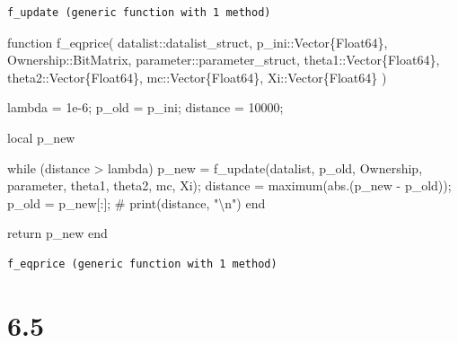\documentclass[
  letterpaper,
  DIV=11,
  numbers=noendperiod]{scrreprt}
\newenvironment{Shaded}{\begin{snugshade}}{\end{snugshade}}
\newcommand{\CommentTok}[1]{\textcolor[rgb]{0.37,0.37,0.37}{#1}}
\newcommand{\ControlFlowTok}[1]{\textcolor[rgb]{0.00,0.23,0.31}{#1}}
\newcommand{\DataTypeTok}[1]{\textcolor[rgb]{0.68,0.00,0.00}{#1}}
\newcommand{\FloatTok}[1]{\textcolor[rgb]{0.68,0.00,0.00}{#1}}
\newcommand{\FunctionTok}[1]{\textcolor[rgb]{0.28,0.35,0.67}{#1}}
\newcommand{\KeywordTok}[1]{\textcolor[rgb]{0.00,0.23,0.31}{#1}}
\newcommand{\NormalTok}[1]{\textcolor[rgb]{0.00,0.23,0.31}{#1}}
\newcommand{\OperatorTok}[1]{\textcolor[rgb]{0.37,0.37,0.37}{#1}}
\begin{document}
\begin{verbatim}
f_update (generic function with 1 method)
\end{verbatim}

\begin{Shaded}
\begin{Highlighting}[]
\KeywordTok{function} \FunctionTok{f\_eqprice}\NormalTok{(}
\NormalTok{        datalist}\OperatorTok{::}\DataTypeTok{datalist\_struct}\NormalTok{,}
\NormalTok{        p\_ini}\OperatorTok{::}\DataTypeTok{Vector\{Float64\}}\NormalTok{,}
\NormalTok{        Ownership}\OperatorTok{::}\DataTypeTok{BitMatrix}\NormalTok{,}
\NormalTok{        parameter}\OperatorTok{::}\DataTypeTok{parameter\_struct}\NormalTok{,}
\NormalTok{        theta1}\OperatorTok{::}\DataTypeTok{Vector\{Float64\}}\NormalTok{,}
\NormalTok{        theta2}\OperatorTok{::}\DataTypeTok{Vector\{Float64\}}\NormalTok{,}
\NormalTok{        mc}\OperatorTok{::}\DataTypeTok{Vector\{Float64\}}\NormalTok{,}
\NormalTok{        Xi}\OperatorTok{::}\DataTypeTok{Vector\{Float64\}}
\NormalTok{    )}
    
\NormalTok{    lambda }\OperatorTok{=} \FloatTok{1e{-}6}\NormalTok{;}
\NormalTok{    p\_old }\OperatorTok{=}\NormalTok{ p\_ini;}
\NormalTok{    distance }\OperatorTok{=} \FloatTok{10000}\NormalTok{;}
    
    \KeywordTok{local}\NormalTok{ p\_new}
    
    \ControlFlowTok{while}\NormalTok{ (distance }\OperatorTok{\textgreater{}}\NormalTok{ lambda)}
\NormalTok{        p\_new }\OperatorTok{=} \FunctionTok{f\_update}\NormalTok{(datalist, p\_old, Ownership, parameter, theta1, theta2, mc, Xi);}
\NormalTok{        distance }\OperatorTok{=} \FunctionTok{maximum}\NormalTok{(}\FunctionTok{abs}\NormalTok{.(p\_new }\OperatorTok{{-}}\NormalTok{ p\_old));}
\NormalTok{        p\_old }\OperatorTok{=}\NormalTok{ p\_new[}\OperatorTok{:}\NormalTok{];}
        \CommentTok{\# print(distance, "\textbackslash{}n")}
    \ControlFlowTok{end}
    
    \ControlFlowTok{return}\NormalTok{ p\_new}
\KeywordTok{end}
\end{Highlighting}
\end{Shaded}

\begin{verbatim}
f_eqprice (generic function with 1 method)
\end{verbatim}

\hypertarget{section-12}{%
\section{6.5}\label{section-12}}
\end{document}

